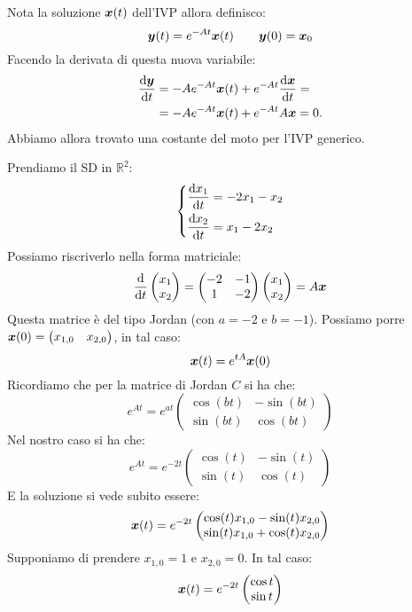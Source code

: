 \noindent
Nota la soluzione $\boldsymbol{x} (t)$ dell'IVP allora definisco:
\[
    \boldsymbol{y} (t) = e^{-At}\boldsymbol{x} (t) \qquad \boldsymbol{y} (0)=\boldsymbol{x}_0
\] 
Facendo la derivata di questa nuova variabile:
\[\begin{aligned}
    \frac{\text{d} \boldsymbol{y}}{\text{d} t} &= - A e^{-At}\boldsymbol{x} (t) + e^{-At}\frac{\text{d} \boldsymbol{x}}{\text{d} t} = \\
					 &=-Ae^{-At}\boldsymbol{x} (t) + e^{-At}A\boldsymbol{x}= 0 
.\end{aligned}\]
Abbiamo allora trovato una costante del moto per l'IVP generico.
\begin{exmp}
    Prendiamo il SD in $\mathbb{R}^2$:
    \[\begin{dcases}
        \frac{\text{d} x_1}{\text{d} t} = -2x_1 - x_2\\
	\frac{\text{d} x_2}{\text{d} t} = x_1-2x_2
    \end{dcases}\] 
    Possiamo riscriverlo nella forma matriciale:
    \[
        \frac{\text{d} }{\text{d} t} \begin{pmatrix} x_1 \\ x_2 \end{pmatrix} =
	\begin{pmatrix} -2 & -1 \\ 1 & -2 \end{pmatrix} \begin{pmatrix} x_1 \\ x_2 \end{pmatrix} = A \boldsymbol{x}
    \] 
    Questa matrice è del tipo Jordan (con  $a = -2$ e $b = -1$). Possiamo porre $\boldsymbol{x} (0) = \begin{pmatrix} x_{1,0} & x_{2, 0} \end{pmatrix}$, in tal caso:
    \[
	\boldsymbol{x} (t) = e^{tA}\boldsymbol{x} (0)
    \] 
    Ricordiamo che per la matrice di Jordan $C$ si ha che:
    \[
	e^{At}=e^{at}\begin{pmatrix} \cos (bt) & -\sin (bt)\\ \sin (bt) & \cos (bt) \end{pmatrix} 
    \] 
    Nel nostro caso si ha che:
    \[
	e^{At}=e^{-2t}\begin{pmatrix} \cos (t) & -\sin (t) \\ \sin (t) & \cos (t) \end{pmatrix} 
    \] 
    E la soluzione si vede subito essere:
    \[
	\boldsymbol{x} (t) = e^{-2t} \begin{pmatrix} \cos (t)x_{1,0} - \sin (t)x_{2, 0} \\ \sin (t)x_{1,0} + \cos (t)x_{2,0} \end{pmatrix} 
    \] 
    Supponiamo di prendere $x_{1,0}=1$ e $x_{2,0} = 0$. In tal caso:
    \[
	\boldsymbol{x} (t)=e^{-2t}\begin{pmatrix} \cos t \\ \sin t \end{pmatrix} 
    \] 
\end{exmp}
\noindent
